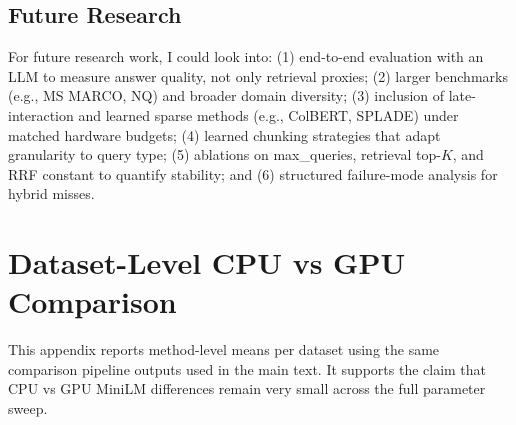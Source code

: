 \documentclass[twoside, 11pt]{article}
\begin{document}
\subsection{Future Research}
For future research work, I could look into: (1) end-to-end evaluation with an LLM to measure answer quality, not only retrieval proxies; (2) larger benchmarks (e.g., MS MARCO, NQ) and broader domain diversity; (3) inclusion of late-interaction and learned sparse methods (e.g., ColBERT, SPLADE) under matched hardware budgets; (4) learned chunking strategies that adapt granularity to query type; (5) ablations on max\_queries, retrieval top-$K$, and RRF constant to quantify stability; and (6) structured failure-mode analysis for hybrid misses.


\appendix
\section{Dataset-Level CPU vs GPU Comparison}
\label{app:dataset_level}
This appendix reports method-level means per dataset using the same comparison pipeline outputs used in the main text. It supports the claim that CPU vs GPU MiniLM differences remain very small across the full parameter sweep.
\end{document}
